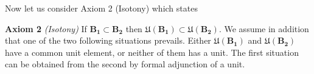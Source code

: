 Now let us consider Axiom 2 (Isotony) which states

\textbf{Axiom 2} \textit{(Isotony)} If $\mathbf{B_1} \subset \mathbf{B_2}$ then $\mathfrak{U}(\mathbf{B_1}) \subset \mathfrak{U}(\mathbf{B_2})$. We assume in addition that one of the two following situations prevails. Either $\mathfrak{U}(\mathbf{B_1})$ and $\mathfrak{U}(\mathbf{B_2})$ have a common unit element, or neither of them has a unit. The first situation can be obtained from the second by formal adjunction of a unit.
